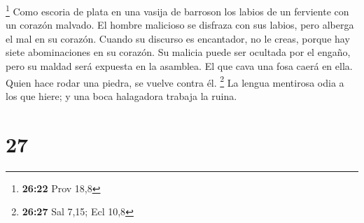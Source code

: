 \footnote{\textbf{26:22} Prov 18,8}  Como escoria de
plata en una vasija de barroson los labios de un ferviente con un
corazón malvado.  El hombre malicioso se disfraza con sus
labios, pero alberga el mal en su corazón.  Cuando su
discurso es encantador, no le creas, porque hay siete abominaciones en
su corazón.  Su malicia puede ser ocultada por el engaño,
pero su maldad será expuesta en la asamblea.  El que cava
una fosa caerá en ella. Quien hace rodar una piedra, se vuelve contra
él. \footnote{\textbf{26:27} Sal 7,15; Ecl 10,8}  La
lengua mentirosa odia a los que hiere; y una boca halagadora trabaja la
ruina.

\hypertarget{section-26}{%
\section{27}\label{section-26}}

